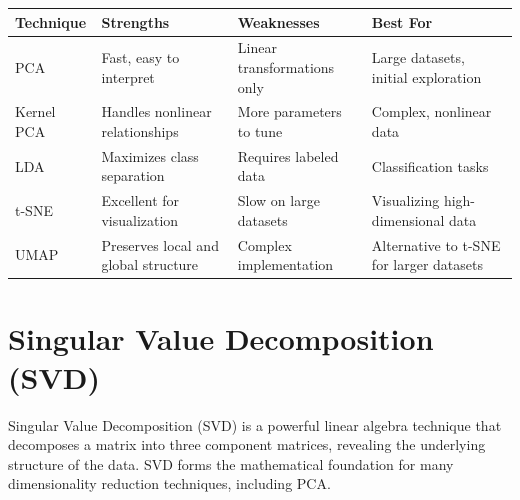 \documentclass[
  letterpaper,
  DIV=11,
  numbers=noendperiod]{scrreprt}
\begin{document}
\begin{longtable}[]{@{}
  >{\raggedright\arraybackslash}p{}
  >{\raggedright\arraybackslash}p{}
  >{\raggedright\arraybackslash}p{}
  >{\raggedright\arraybackslash}p{}@{}}
\toprule\noalign{}
\begin{minipage}[b]{\linewidth}\raggedright
Technique
\end{minipage} & \begin{minipage}[b]{\linewidth}\raggedright
Strengths
\end{minipage} & \begin{minipage}[b]{\linewidth}\raggedright
Weaknesses
\end{minipage} & \begin{minipage}[b]{\linewidth}\raggedright
Best For
\end{minipage} \\
\midrule\noalign{}
\endhead
\bottomrule\noalign{}
\endlastfoot
PCA & Fast, easy to interpret & Linear transformations only & Large
datasets, initial exploration \\
Kernel PCA & Handles nonlinear relationships & More parameters to tune &
Complex, nonlinear data \\
LDA & Maximizes class separation & Requires labeled data &
Classification tasks \\
t-SNE & Excellent for visualization & Slow on large datasets &
Visualizing high-dimensional data \\
UMAP & Preserves local and global structure & Complex implementation &
Alternative to t-SNE for larger datasets \\
\end{longtable}

\section{Singular Value Decomposition
(SVD)}\label{singular-value-decomposition-svd}

Singular Value Decomposition (SVD) is a powerful linear algebra
technique that decomposes a matrix into three component matrices,
revealing the underlying structure of the data. SVD forms the
mathematical foundation for many dimensionality reduction techniques,
including PCA.
\end{document}

